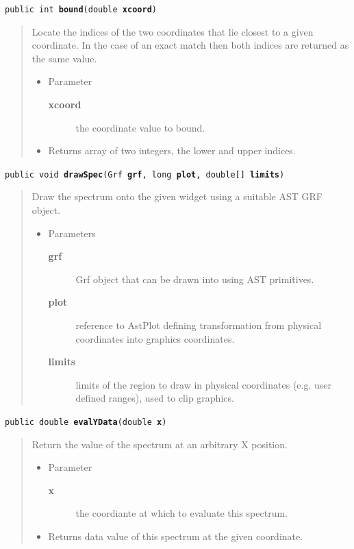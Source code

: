 \documentclass[twoside,11pt]{article}
\renewcommand{\_}{\texttt{\symbol{95}}}
\newcommand{\method}[1]{\texttt{#1}}
\newenvironment{desc}{\begin{quote}}{\end{quote}}
\begin{document}
\method{public int \textbf{bound}(\texttt{double} \textbf{xcoord})\label{l31}\label{l32}}
\begin{desc}Locate the indices of the two coordinates that lie closest to a
 given coordinate. In the case of an exact match then both
 indices are returned as the same value.
\begin{itemize}
\item{Parameter
  \begin{description}
   \item[\textbf{xcoord}]{the coordinate value to bound.}
  \end{description}}
\end{itemize}
\begin{itemize}
\item{Returns array of two integers, the lower and upper indices. }
\end{itemize}
\end{desc}

\method{public void \textbf{drawSpec}(\texttt{Grf} \textbf{grf}, \texttt{long} \textbf{plot}, \texttt{double[]} \textbf{limits})\label{l33}\label{l34}}
\begin{desc}Draw the spectrum onto the given widget using a suitable AST
 GRF object.
\begin{itemize}
\item{Parameters
  \begin{description}
   \item[\textbf{grf}]{Grf object that can be drawn into using AST
            primitives.}
   \item[\textbf{plot}]{reference to AstPlot defining transformation from
             physical coordinates into graphics coordinates.}
   \item[\textbf{limits}]{limits of the region to draw in physical
               coordinates (e.g. user defined ranges), used to
               clip graphics.}
  \end{description}}
\end{itemize}
\end{desc}

\method{public double \textbf{evalYData}(\texttt{double} \textbf{x})\label{l35}\label{l36}}
\begin{desc}Return the value of the spectrum at an arbitrary X position.
\begin{itemize}
\item{Parameter
  \begin{description}
   \item[\textbf{x}]{the coordiante at which to evaluate this spectrum.}
  \end{description}}
\end{itemize}
\begin{itemize}
\item{Returns data value of this spectrum at the given coordinate. }
\end{itemize}
\end{desc}
\end{document}
